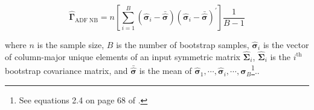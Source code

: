 \begin{equation}
    \label{eq:gammacap-adfnb}
    \hat{\boldsymbol{\Gamma}}_{\mathrm{ADF \; NB}}
    =
    n
    \left[
    \sum_{i = 1}^{B}
    \left( \hat{\boldsymbol{\sigma}}_i - \bar{\hat{\boldsymbol{\sigma}}} \right)
    \left( \hat{\boldsymbol{\sigma}}_i - \bar{\hat{\boldsymbol{\sigma}}} \right)^{\prime}
    \right]
    \frac{1}{B - 1}
\end{equation}

\noindent where
$n$ is the sample size,
$B$ is the number of bootstrap samples,
$\hat{\boldsymbol{\sigma}}_i$ is the vector of column-major unique elements of an input symmetric matrix
$\hat{\boldsymbol{\Sigma}}_i$,
$\hat{\boldsymbol{\Sigma}}_i$ is the $i^{\mathrm{th}}$ bootstrap covariance matrix,
and
$\bar{\hat{\boldsymbol{\sigma}}}$ is the mean of $\hat{\boldsymbol{\sigma}}_1, \cdots, \hat{\boldsymbol{\sigma}}_i, \cdots, \hat{\boldsymbol{\sigma}}_B$\footnote{
  See equations 2.4 on page 68 of \Textcite{Yung-1994}.
}..